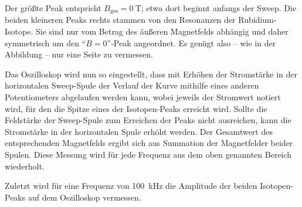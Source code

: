     Der größte Peak entspricht $B_\text{ges} = \SI{0}{\tesla}$;
    etwa dort beginnt anfangs der Sweep.
    Die beiden kleineren Peaks rechts stammen von den Resonanzen der Rubidium-Isotope.
    Sie sind nur vom Betrag des äußeren Magnetfelds abhängig und daher symmetrisch um den \enquote{$B=0$}-Peak angeordnet.
    Es genügt also – wie in der Abbildung – nur eine Seite zu vermessen.

    Das Oszilloskop wird nun so eingestellt,
    dass mit Erhöhen der Stromstärke in der horizontalen Sweep-Spule der Verlauf der Kurve mithilfe eines anderen Potentiometers abgelaufen werden kann,
    wobei jeweils der Stromwert notiert wird,
    für den die Spitze eines der Isotopen-Peaks erreicht wird.
    Sollte die Feldstärke der Sweep-Spule zum Erreichen der Peaks nicht ausreichen,
    kann die Stromstärke in der horizontalen Spule erhöht werden.
    Der Gesamtwert des entsprechenden Magnetfelds ergibt sich aus Summation der Magnetfelder beider Spulen.
    Diese Messung wird für jede Frequenz aus dem oben genannten Bereich wiederholt.

    Zuletzt wird für eine Frequenz von \SI{100}{\kilo\hertz} die Amplitude der beiden Isotopen-Peaks auf dem Oszilloskop vermessen.
